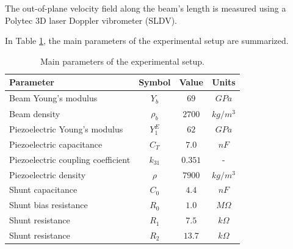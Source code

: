 The out-of-plane velocity field along the beam's length is measured using a Polytec 3D laser Doppler vibrometer (SLDV).

In Table \ref{tab:experimental_setup_parameters}, the main parameters of the experimental setup are summarized.

\begin{table}[H]

    \centering

    \begin{tabular}{|l|c|c|c|}
        \hline
        \textbf{Parameter}                 & \textbf{Symbol} & \textbf{Value} & \textbf{Units} \\
        \hline
        Beam Young's modulus               & $Y_b$           & $69$           & $GPa$          \\
        Beam density                       & $\rho_b$        & $2700$         & $kg/m^3$       \\
        \hline
        Piezoelectric Young's modulus      & $Y_1^E$         & $62$           & $GPa$          \\
        Piezoelectric capacitance          & $C_T$           & $7.0$          & $nF$           \\
        Piezoelectric coupling coefficient & $k_{31}$        & $0.351$        & -              \\
        Piezoelectric density              & $\rho$          & $7900$         & $kg/m^3$       \\
        \hline
        Shunt capacitance                  & $C_0$           & $4.4$          & $nF$           \\
        Shunt bias resistance              & $R_0$           & $1.0$          & $M\Omega$      \\
        Shunt resistance                   & $R_1$           & $7.5$          & $k\Omega$      \\
        Shunt resistance                   & $R_2$           & $13.7$         & $k\Omega$      \\
        \hline
    \end{tabular}

    \caption{Main parameters of the experimental setup.}
    \label{tab:experimental_setup_parameters}

\end{table}